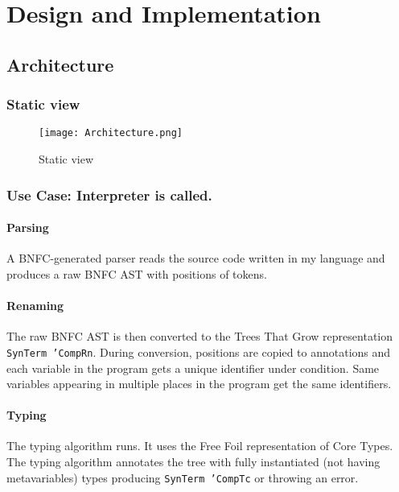 \chapter{Design and Implementation}
\label{chap:DesignImplementation}

\section{Architecture}

\subsection{Static view}

\newpage

\begin{figure}[h]
  \centering
  \texttt{[image: Architecture.png]}
  \caption{Static view}
  \label{Architecture}
\end{figure}

\newpage

\subsection{Use Case: Interpreter is called.}

\subsubsection{Parsing}

A BNFC-generated parser reads the source code written in my language and produces a raw BNFC AST with positions of tokens.

\subsubsection{Renaming}

The raw BNFC AST is then converted to the Trees That Grow representation \texttt{SynTerm 'CompRn}.
During conversion, positions are copied to annotations and each variable in the program gets a unique identifier under condition.
Same variables appearing in multiple places in the program get the same identifiers.

\subsubsection{Typing}

The typing algorithm runs.
It uses the Free Foil representation of Core Types.
The typing algorithm annotates the tree with fully instantiated (not having metavariables) types producing \texttt{SynTerm 'CompTc} or throwing an error.

